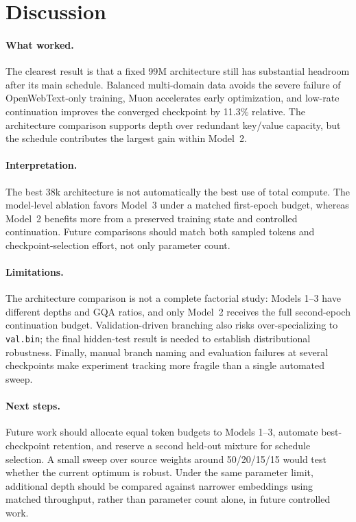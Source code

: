 \documentclass{article}
\begin{document}
\section{Discussion}

\paragraph{What worked.}
The clearest result is that a fixed 99M architecture still has substantial
headroom after its main schedule. Balanced multi-domain data avoids the severe
failure of OpenWebText-only training, Muon accelerates early optimization, and
low-rate continuation improves the converged checkpoint by 11.3\% relative.
The architecture comparison supports depth over redundant key/value capacity,
but the schedule contributes the largest gain within Model~2.

\paragraph{Interpretation.}
The best 38k architecture is not automatically the best use of total compute.
The model-level ablation favors Model~3 under a matched first-epoch budget,
whereas Model~2 benefits more from a preserved training state and controlled
continuation. Future comparisons should match both sampled tokens and
checkpoint-selection effort, not only parameter count.

\paragraph{Limitations.}
The architecture comparison is not a complete factorial study: Models 1--3
have different depths and GQA ratios, and only Model~2 receives the full
second-epoch continuation budget. Validation-driven branching also risks over-specializing
to \texttt{val.bin}; the final hidden-test result is needed to establish
distributional robustness. Finally, manual branch naming and evaluation
failures at several checkpoints make experiment tracking more fragile than a
single automated sweep.

\paragraph{Next steps.}
Future work should allocate equal token budgets to Models 1--3, automate
best-checkpoint retention, and reserve a second held-out mixture for schedule
selection. A small sweep over source weights around 50/20/15/15 would test
whether the current optimum is robust. Under the same parameter limit,
additional depth should be compared against narrower embeddings using matched
throughput, rather than parameter count alone, in future controlled work.
\end{document}
